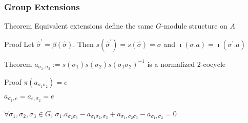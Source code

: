 \documentclass[10pt,xcolor=table,dvipsnames]{beamer}
\begin{document}
\begin{frame}
\frametitle{Group Extensions}
\begin{block}{Theorem}%
Equivalent extensions define the same $G$-module structure on $A$
\end{block}

\begin{block}{Proof}%
Let $\widehat{\sigma }^{\prime }=\beta \left( \widehat{\sigma }\right) $.
Then $s\left( \widehat{\sigma }^{\prime }\right) =s\left( \widehat{\sigma }%
\right) =\sigma $ and $\imath \left( \sigma .a\right) =\imath \left( \sigma
^{\prime }.a\right) $
\end{block}

\begin{block}{Theorem}%
\textcolor{stupid}{$a_{\sigma _{1},\sigma _{2}}:=s\left( \sigma _{1}\right) s\left( \sigma
_{2}\right) s\left( \sigma _{1}\sigma _{2}\right) ^{-1}$ is a normalized $2$-cocycle}
\end{block}

\begin{block}{Proof}%
\textcolor{stupid}{$\pi \left(
a_{\sigma _{1}\sigma _{2}}\right) =e$}

\textcolor{stupid}{$a_{\sigma _{1},e}=a_{e,\sigma _{2}}=e$}

\textcolor{stupid}{$\forall \sigma _{1},\sigma _{2},\sigma _{3} \in G$, $\sigma _{1}.a_{\sigma
_{2}\sigma _{3}}-a_{\sigma _{1}\sigma _{2},\sigma _{3}}+a_{\sigma
_{1},\sigma _{2}\sigma _{3}}-a_{\sigma _{1},\sigma _{2}}=0$}


\end{block}

\end{frame}
\end{document}
